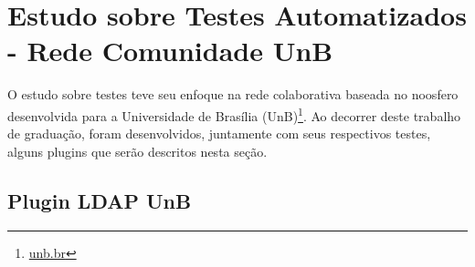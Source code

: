 
\section {Estudo sobre Testes Automatizados - Rede Comunidade UnB}

O estudo sobre testes teve seu enfoque na rede colaborativa baseada 
no noosfero desenvolvida para a Universidade de Brasília (UnB)\footnote{\url{unb.br}}. Ao decorrer deste trabalho de graduação, foram desenvolvidos, juntamente com seus respectivos testes, alguns plugins que serão descritos nesta seção.

\subsection{Plugin LDAP UnB}

